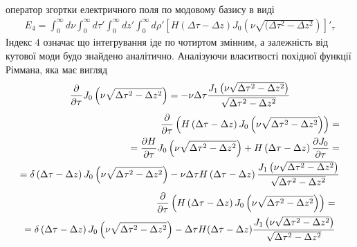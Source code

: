 оператор згортки електричного поля по модовому базису в виді
%
\begin{equation*} \begin{aligned}
E_4 = \int_0^\infty d\nu \int_0^\infty d \tau' \int_0^\infty dz' 
\int_0^\infty d\rho' \left[ H(\Delta \tau - \Delta z) 
J_0 \left( \nu \sqrt{(\Delta \tau^2 - \Delta z^2} \right) \right]'_\tau
\end{aligned} \end{equation*}
%
Індекс $ 4 $ означає що інтегрування іде по чотиртом змінним, а залежність 
від кутової моди будо знайдено аналітично. Аналізуючи власитвості похідної 
функції Ріммана, яка має вигляд
%
\textcolor{blue} { \begin{equation*} \begin{aligned}
\frac{\partial }{\partial \tau} J_0 \left( \nu \sqrt{\Delta \tau^2 - \Delta z^2} \right) = 
- \nu \Delta \tau 
\frac{J_1 \left( \nu \sqrt{\Delta \tau^2 - \Delta z^2} \right)}
{\sqrt{\Delta \tau^2 - \Delta z^2}}
\end{aligned} \end{equation*} }
%
\textcolor{blue} { \begin{equation*} \begin{aligned}
\frac{\partial }{\partial \tau} \left( H \left( \Delta \tau - \Delta z \right)
J_0 \left( \nu \sqrt{ \Delta \tau^2 - \Delta z^2 } \right) \right) = \\
= \frac{\partial H}{\partial \tau} J_0 \left( \nu \sqrt{ \Delta \tau^2 - \Delta z^2 } \right) + 
H \left( \Delta \tau - \Delta z \right) \frac{\partial J_0}{\partial \tau} = \\
= \delta \left( \Delta \tau - \Delta z \right)
J_0 \left( \nu \sqrt{ \Delta \tau^2 - \Delta z^2 } \right) - 
\nu \Delta \tau H \left( \Delta \tau - \Delta z \right)
\frac{J_1 \left( \nu \sqrt{\Delta \tau^2 - \Delta z^2} \right)}
{\sqrt{\Delta \tau^2 - \Delta z^2}}
\end{aligned} \end{equation*} }
%
\begin{equation*} \begin{aligned}
\frac{\partial }{\partial \tau} \left( H \left( \Delta \tau - \Delta z \right)
J_0 \left( \nu \sqrt{ \Delta \tau^2 - \Delta z^2 } \right) \right) = \\
= \delta \left( \Delta \tau - \Delta z \right)
J_0 \left( \nu \sqrt{\Delta \tau^2 - \Delta z^2} \right) - 
\Delta \tau H(\Delta \tau - \Delta z) 
\frac{J_1 \left( \nu \sqrt{\Delta \tau^2 - \Delta z^2} \right)}
{\sqrt{\Delta \tau^2 - \Delta z^2}}
\end{aligned} \end{equation*}
